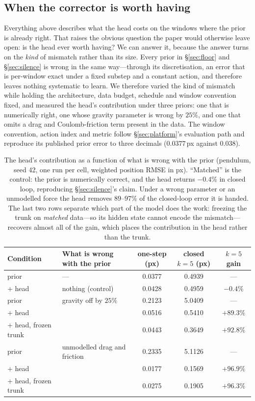 \documentclass{article}
\begin{document}
\subsection{When the corrector is worth having}
\label{sec:when}

Everything above describes what the head costs on the windows where the prior is
already right. That raises the obvious question the paper would otherwise leave open:
is the head ever worth having? We can answer it, because the answer turns on the
\emph{kind} of mismatch rather than its size. Every prior in \S\ref{sec:floor} and
\S\ref{sec:silence} is wrong in the same way---through its discretisation, an error that
is per-window exact under a fixed substep and a constant action, and therefore leaves
nothing systematic to learn. We therefore varied the kind of mismatch while holding the
architecture, data budget, schedule and window convention fixed, and measured the head's
contribution under three priors: one that is numerically right, one whose gravity
parameter is wrong by $25\%$, and one that omits a drag and Coulomb-friction term
present in the data. The window convention, action index and metric follow
\S\ref{sec:platform}'s evaluation path and reproduce its published prior error to three
decimals ($0.0377$\,px against $0.038$).

\begin{table}[t]
\centering
\caption{The head's contribution as a function of what is wrong with the prior
(pendulum, seed 42, one run per cell, weighted position RMSE in px). ``Matched'' is the
control: the prior is numerically correct, and the head returns $-0.4\%$ in closed loop,
reproducing \S\ref{sec:silence}'s claim. Under a wrong parameter or an unmodelled force
the head removes $89$--$97\%$ of the closed-loop error it is handed. The last two rows
separate which part of the model does the work: freezing the trunk on \emph{matched}
data---so its hidden state cannot encode the mismatch---recovers almost all of the gain,
which places the contribution in the head rather than the trunk.}
\label{tab:corrector}
\small
\begin{tabular}{llccc}
\toprule
Condition & What is wrong with the prior & one-step (px) & closed $k{=}5$ (px) & $k{=}5$ gain \\
\midrule
prior & --- & 0.0377 & 0.4939 & --- \\
\quad + head & nothing (control) & 0.0428 & 0.4959 & $-0.4\%$ \\
\midrule
prior & gravity off by $25\%$ & 0.2123 & 5.0409 & --- \\
\quad + head & & 0.0516 & 0.5410 & $+89.3\%$ \\
\quad + head, frozen trunk & & 0.0443 & 0.3649 & $+92.8\%$ \\
\midrule
prior & unmodelled drag and friction & 0.2335 & 5.1126 & --- \\
\quad + head & & 0.0177 & 0.1569 & $+96.9\%$ \\
\quad + head, frozen trunk & & 0.0275 & 0.1905 & $+96.3\%$ \\
\bottomrule
\end{tabular}
\end{table}
\end{document}
